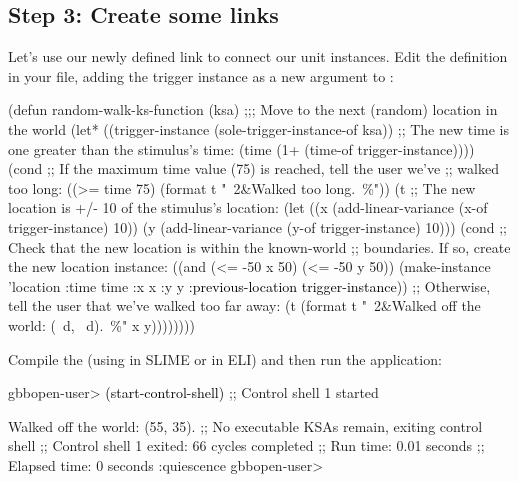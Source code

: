 \documentclass[10pt,twoside,english,pdftex]{article}
\begin{document}
\subsection*{Step 3: Create some links}

Let's use our newly defined
 link to connect our
 unit instances.  Edit the
 definition in your
 file, adding the trigger instance as a new
 argument to :
%
\W\supp
\begin{example}
\textcolor{darkergray}{%
  (defun random-walk-ks-function (ksa)
    ;;; Move to the next (random) location in the world
    (let* ((trigger-instance (sole-trigger-instance-of ksa))
           ;; The new time is one greater than the stimulus's time:
           (time (1+ (time-of trigger-instance))))
      (cond
       ;; If the maximum time value (75) is reached, tell the user we've
       ;; walked too long:
       ((>= time 75) (format t "~2&Walked too long.~\%"))
       (t ;; The new location is +/- 10 of the stimulus's location:
        (let ((x (add-linear-variance (x-of trigger-instance) 10))
              (y (add-linear-variance (y-of trigger-instance) 10)))
          (cond
           ;; Check that the new location is within the known-world
           ;; boundaries.  If so, create the new location instance:
           ((and (<= -50 x 50) (<= -50 y 50))
            (make-instance 'location 
              :time time 
              :x x 
              :y y
              \textcolor{black}{:previous-location trigger-instance}))
           ;; Otherwise, tell the user that we've walked too far away:
           (t (format t "~2&Walked off the world: (~d, ~d).~\%" x y))))))))}
\end{example}

Compile the  (using 
in SLIME or  in ELI) and then run the application:
%
\W\supp
\begin{example}
\textcolor{darkergray}{%
  gbbopen-user> \textcolor{black}{(start-control-shell)}
  ;; Control shell 1 started

  Walked off the world: (55, 35).
  ;; No executable KSAs remain, exiting control shell
  ;; Control shell 1 exited: 66 cycles completed
  ;; Run time: 0.01 seconds
  ;; Elapsed time: 0 seconds
  :quiescence
  gbbopen-user>}
\end{example}
\end{document}
